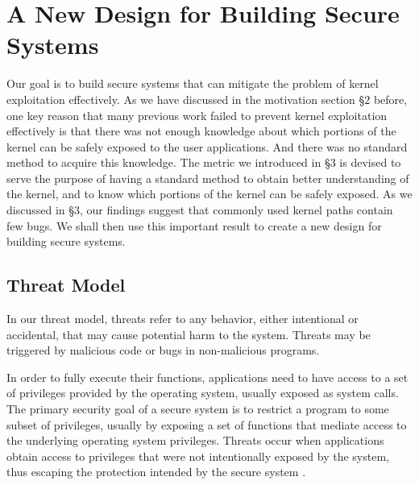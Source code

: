 \section{A New Design for Building Secure Systems}
\label{sec.design}



Our goal is to build secure systems that can mitigate the problem of kernel exploitation effectively. 
As we have discussed in the motivation section \S{2} before, one key reason that many previous work 
failed to prevent kernel exploitation effectively is that there was not enough knowledge about 
which portions of the kernel can be safely exposed to the user applications. 
And there was no standard method to acquire this knowledge. 
The metric we introduced in \S{3} is devised to serve the purpose of having a standard method to 
obtain better understanding of the kernel, and to know which portions of the kernel can be safely exposed. 
As we discussed in \S{3}, our findings suggest that commonly used kernel paths contain few bugs.
We shall then use this important result to create a new design for building secure systems. 

\subsection{Threat Model}
In our threat model, threats refer to any behavior, either intentional or accidental, that may cause potential harm 
to the system. Threats may be triggered by malicious code or bugs in non-malicious programs.

In order to fully execute their functions, applications need to have access to a set of privileges provided by 
the operating system, usually exposed as system calls. The primary security goal of a secure system is to 
restrict a program to some subset of privileges, usually by exposing a set of functions that mediate 
access to the underlying operating system privileges. Threats occur when applications obtain access to 
privileges that were not intentionally exposed by the system, thus escaping the protection 
intended by the secure system \cite{Repy:10}.

